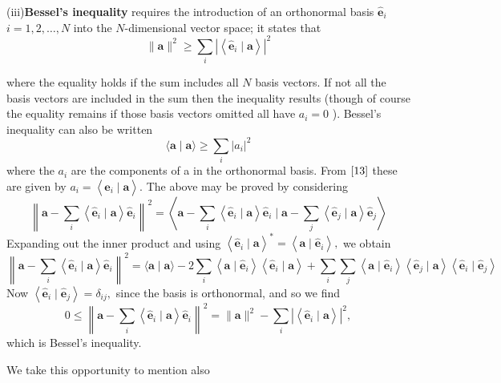 \documentclass[12pt]{book}
\theoremstyle{definition}\newtheorem{dfn}{Définition}[chapter]
\theoremstyle{plain}\newtheorem{thm}{Théorème}[chapter]
\theoremstyle{plain}\newtheorem{prp}{Proposition}[chapter]
\theoremstyle{plain}\newtheorem{lem}{\bf Lemme}[chapter]
\theoremstyle{plain}\newtheorem{axm}{\bf Axiome}[chapter]
\theoremstyle{plain}\newtheorem{lmm}{\bf Lemme}[chapter]
\theoremstyle{plain}\newtheorem{cor}{\bf Corollaire}[chapter]
\theoremstyle{remark}\newtheorem{rem}{Remarque}[chapter]
\begin{document}
(iii){\bf Bessel's inequality} requires the introduction of an orthonormal basis $\hat{\mathbf{e}}_{i}$ $i=1,2, \ldots, N$ into the $N$-dimensional vector space; it states that
\begin{equation}
\boxed{\|\mathbf{a}\|^{2} \geq \sum_{i}\left|\left\langle\hat{\mathbf{e}}_{i} \mid \mathbf{a}\right\rangle\right|^{2}}
\end{equation}


where the equality holds if the sum includes all $N$ basis vectors. If not all the basis vectors are included in the sum then the inequality results (though of course the equality remains if those basis vectors omitted all have $a_{i}=0$ ). Bessel's inequality can also be written
$$
\langle\mathbf{a} \mid \mathbf{a}\rangle \geq \sum_{i}\left|a_{i}\right|^{2}
$$
where the $a_{i}$ are the components of a in the orthonormal basis. From $\ref{13}$ these are given by $a_{i}=\left\langle\hat{\mathbf{e}}_{i} \mid \mathbf{a}\right\rangle .$ The above may be proved by considering
$$
\left\|\mathbf{a}-\sum_{i}\left\langle\hat{\mathbf{e}}_{i} \mid \mathbf{a}\right\rangle \hat{\mathbf{e}}_{i}\right\|^{2}=\left\langle\mathbf{a}-\sum_{i}\left\langle\hat{\mathbf{e}}_{i} \mid \mathbf{a}\right\rangle \hat{\mathbf{e}}_{i} \mid \mathbf{a}-\sum_{j}\left\langle\hat{\mathbf{e}}_{j} \mid \mathbf{a}\right\rangle \hat{\mathbf{e}}_{j}\right\rangle
$$
Expanding out the inner product and using $\left\langle\hat{\mathbf{e}}_{i} \mid \mathbf{a}\right\rangle^{*}=\left\langle\mathbf{a} \mid \hat{\mathbf{e}}_{i}\right\rangle,$ we obtain
$$
\left\|\mathbf{a}-\sum_{i}\left\langle\hat{\mathbf{e}}_{i} \mid \mathbf{a}\right\rangle \hat{\mathbf{e}}_{i}\right\|^{2}=\langle\mathbf{a} \mid \mathbf{a}\rangle-2 \sum_{i}\left\langle\mathbf{a} \mid \hat{\mathbf{e}}_{i}\right\rangle\left\langle\hat{\mathbf{e}}_{i} \mid \mathbf{a}\right\rangle+\sum_{i} \sum_{j}\left\langle\mathbf{a} \mid \hat{\mathbf{e}}_{i}\right\rangle\left\langle\hat{\mathbf{e}}_{j} \mid \mathbf{a}\right\rangle\left\langle\hat{\mathbf{e}}_{i} \mid \hat{\mathbf{e}}_{j}\right\rangle
$$
Now $\left\langle\hat{\mathbf{e}}_{i} \mid \hat{\mathbf{e}}_{j}\right\rangle=\delta_{i j},$ since the basis is orthonormal, and so we find
$$
0 \leq\left\|\mathbf{a}-\sum_{i}\left\langle\hat{\mathbf{e}}_{i} \mid \mathbf{a}\right\rangle \hat{\mathbf{e}}_{i}\right\|^{2}=\|\mathbf{a}\|^{2}-\sum_{i}\left|\left\langle\hat{\mathbf{e}}_{i} \mid \mathbf{a}\right\rangle\right|^{2},
$$
which is Bessel's inequality.

We take this opportunity to mention also
\end{document}
